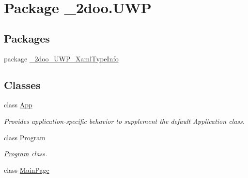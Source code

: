 \hypertarget{namespace__2doo_1_1_u_w_p}{
\section{Package \_\-2doo.UWP}
\label{namespace__2doo_1_1_u_w_p}
}
\subsection*{Packages}
\begin{CompactItemize}
\item 
package \hyperlink{namespace__2doo_1_1_u_w_p_1_1__2doo___u_w_p___xaml_type_info}{\_\-2doo\_\-UWP\_\-XamlTypeInfo}
\end{CompactItemize}
\subsection*{Classes}
\begin{CompactItemize}
\item 
class \hyperlink{class__2doo_1_1_u_w_p_1_1_app}{App}
\begin{CompactList}\small\item\em Provides application-specific behavior to supplement the default Application class. \item\end{CompactList}\item 
class \hyperlink{class__2doo_1_1_u_w_p_1_1_program}{Program}
\begin{CompactList}\small\item\em \hyperlink{class__2doo_1_1_u_w_p_1_1_program}{Program} class. \item\end{CompactList}\item 
class \hyperlink{class__2doo_1_1_u_w_p_1_1_main_page}{MainPage}
\end{CompactItemize}
